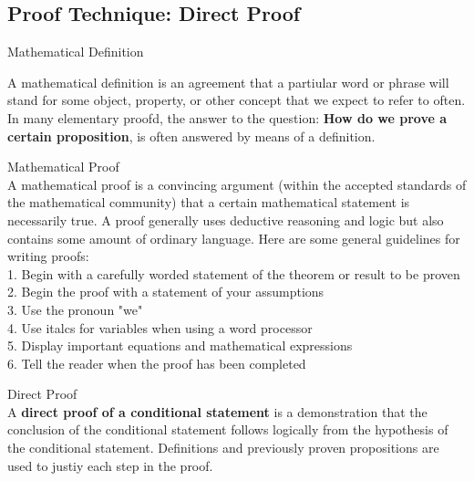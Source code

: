 \newpage
\subsection{Proof Technique: Direct Proof}

\begin{definition}
Mathematical Definition

A mathematical definition is an agreement that a partiular word or phrase will stand for some object, property, or other concept that we expect to refer to often. In many elementary proofd, the answer to the question: {\bf How do we prove a certain proposition}, is often answered by means of a definition. 
\end{definition}


\begin{definition}
Mathematical Proof \\

A mathematical proof is a convincing argument (within the accepted standards of the mathematical community) that a certain mathematical statement is necessarily true. A proof generally uses deductive reasoning and logic but also contains some amount of ordinary language. Here are some general guidelines for writing proofs: \\
1. Begin with a carefully worded statement of the theorem or result to be proven \\
2. Begin the proof with a statement of your assumptions \\
3. Use the pronoun "we" \\
4. Use italcs for variables when using a word processor \\
5. Display important equations and mathematical expressions \\
6. Tell the reader when the proof has been completed \\
\end{definition}


\begin{definition}
Direct Proof \\

A {\bf direct proof of a conditional statement} is a demonstration that the conclusion of the conditional statement follows logically from the hypothesis of the conditional statement. Definitions and previously proven propositions are used to justiy each step in the proof. \\
\end{definition}

